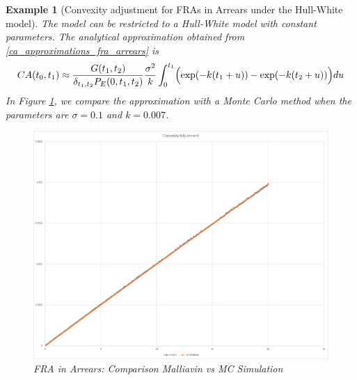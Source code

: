\documentclass[a4paper,10pt]{article}
\newtheorem{example}[theorem]{Example}
\newcommand{\1}{\mathbf{1}}
\begin{document}
\begin{example}[Convexity adjustment for FRAs in Arrears under the Hull-White model]\label{example_convexity_hw_FRAsinArrears}
The model can be restricted to a Hull-White model with constant parameters. The analytical approximation obtained from \eqref{ca_approximations_fra_arrears} is
\begin{equation*}
CA(t_0,t_1) \approx \frac{G(t_1,t_2)}{\delta_{t_1,t_2}P_{E}(0,t_1,t_2)}  \frac{\sigma^{2}}{k} \int_{0}^{t_1} \Bigl(\exp(- k(t_1 + u)) -   \exp(- k(t_2 + u))\Bigr) du 
\end{equation*}
In Figure \ref{fig:FRA_HW}, we compare the approximation with a Monte Carlo method when the parameters are $\sigma=0.1$ and $k=0.007$.
\begin{figure}[H]
		\begin{center}
		\includegraphics[scale=0.3]{Figures/fra_convexity.jpg}
		\end{center}
		\caption{FRA in Arrears: Comparison Malliavin vs MC Simulation}
		\label{fig:FRA_HW}
\end{figure}
\end{example}
\end{document}
